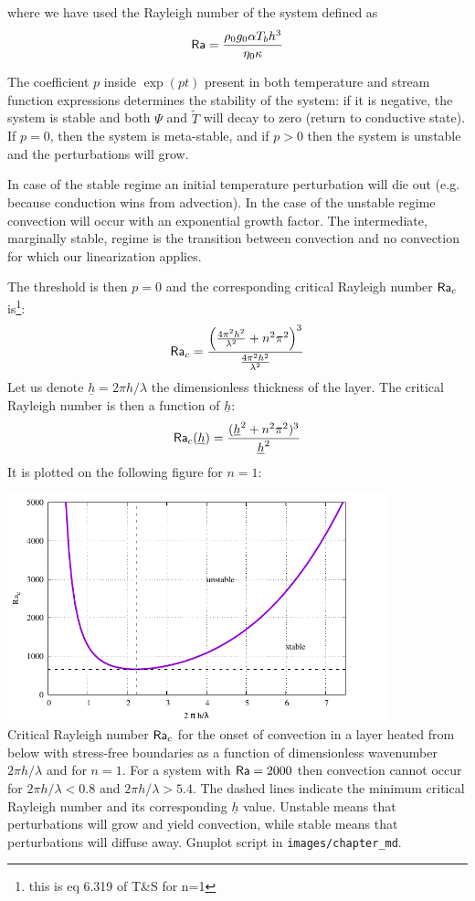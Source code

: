 where we have used the Rayleigh number of the system defined as 
\[
{\mathsf{Ra}}= \frac{\rho_0 g_0 \alpha T_b h^3}{\eta_0 \kappa}
\]


The coefficient $p$ inside $\exp(pt)$ present in both temperature and stream function expressions determines the stability of the system: if it is negative, 
the system is stable and both $\Psi$ and $\tilde{T}$ will decay to zero (return to conductive state). 
If $p=0$, then the system is meta-stable, and if $p>0$ then the system is unstable and 
the perturbations will grow. 

In case of the stable regime an initial temperature perturbation will die out (e.g. because conduction wins from advection). In the case of the unstable regime convection will occur with an exponential growth factor. The intermediate, marginally stable, regime is the transition between convection and no convection for which our linearization applies.

The threshold is then $p=0$ and the corresponding critical Rayleigh number ${\mathsf{Ra}}_c$ 
is\footnote{this is eq 6.319 of T\&S for n=1}:
\[
{\mathsf{Ra}}_c= \frac{ \left( \frac{4\pi^2 h^2}{\lambda^2} + n^2\pi^2 \right)^3   }
{\frac{4 \pi^2 h^2}{\lambda^2}}
\]
Let us denote $\underline{h}=2 \pi h/\lambda$ the dimensionless thickness of the layer.
The critical Rayleigh number is then a function of $\underline{h}$:
\[
{\mathsf{Ra}}_c(\underline{h}) = \frac{(\underline{h}^2 + n^2 \pi^2)^3}{\underline{h}^2}
\]
It is plotted on the following figure for $n=1$:

\begin{center}
\includegraphics[width=11cm]{images/chapter_md/Ra}\\
{\captionfont 
Critical Rayleigh number ${\mathsf{Ra}}_c$ for the onset of
convection in a layer heated from below with stress-free
boundaries as a function of dimensionless wavenumber $2 \pi h/\lambda$ and for $n=1$.
For a system with ${\mathsf{Ra}}=2000$ then convection cannot occur for $2 \pi h/\lambda< 0.8$ and 
$2 \pi h/\lambda > 5.4$. The dashed lines indicate the minimum critical Rayleigh number and its
corresponding $\underline{h}$ value.
Unstable means that perturbations will grow and yield convection, 
while stable means that perturbations will diffuse away.
Gnuplot script in {\tt images/chapter\_md}.}
\end{center}





